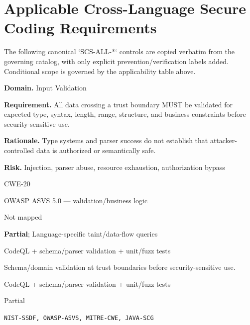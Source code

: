 \documentclass[10pt,letterpaper]{article}
\newcommand{\prioritybadge}[2]{\tcbox[on line,boxrule=0pt,arc=1.2mm,boxsep=0.7mm,left=1mm,right=1mm,top=0.4mm,bottom=0.4mm,colback=#2!12,coltext=#2]{\scriptsize\bfseries #1}}
\begin{document}
\section{Applicable Cross-Language Secure Coding Requirements}
The following canonical `SCS-ALL-*` controls are copied verbatim from the governing catalog, with only explicit prevention/verification labels added. Conditional scope is governed by the applicability table above.
\begin{rulebox}[title={\texttt{SCS-ALL-INPUT-001} \hfill \prioritybadge{High Priority}{High}}]
\textbf{Domain.} Input Validation

\textbf{Requirement.} All data crossing a trust boundary MUST be validated for expected type, syntax, length, range, structure, and business constraints before security-sensitive use.

\textbf{Rationale.} Type systems and parser success do not establish that attacker-controlled data is authorized or semantically safe.

\textbf{Risk.} Injection, parser abuse, resource exhaustion, authorization bypass

\begin{description}[leftmargin=2.65cm,labelwidth=2.3cm,style=nextline,itemsep=1pt,topsep=3pt]
  \item[CWE] CWE-20
  \item[OWASP] OWASP ASVS 5.0 --- validation/business logic
  \item[CERT] Not mapped
  \item[CodeQL] \textbf{Partial}; Language-specific taint/data-flow queries
  \item[Enforcement] CodeQL + schema/parser validation + unit/fuzz tests
  \item[Prevention] Schema/domain validation at trust boundaries before security-sensitive use.
  \item[Verification] CodeQL + schema/parser validation + unit/fuzz tests
  \item[Automation] Partial
  \item[Sources] \texttt{NIST-SSDF, OWASP-ASVS, MITRE-CWE, JAVA-SCG}
\end{description}
\end{rulebox}
\end{document}
